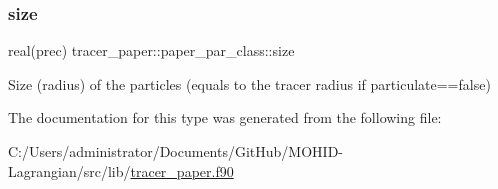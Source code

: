 \subsubsection{\texorpdfstring{size}{size}}
{\footnotesize\ttfamily real(prec) tracer\+\_\+paper\+::paper\+\_\+par\+\_\+class\+::size\hspace{0.3cm}{\ttfamily [private]}}



Size (radius) of the particles (equals to the tracer radius if particulate==false) 



The documentation for this type was generated from the following file\+:\begin{DoxyCompactItemize}
\item 
C\+:/\+Users/administrator/\+Documents/\+Git\+Hub/\+M\+O\+H\+I\+D-\/\+Lagrangian/src/lib/\mbox{\hyperlink{tracer__paper_8f90}{tracer\+\_\+paper.\+f90}}\end{DoxyCompactItemize}
